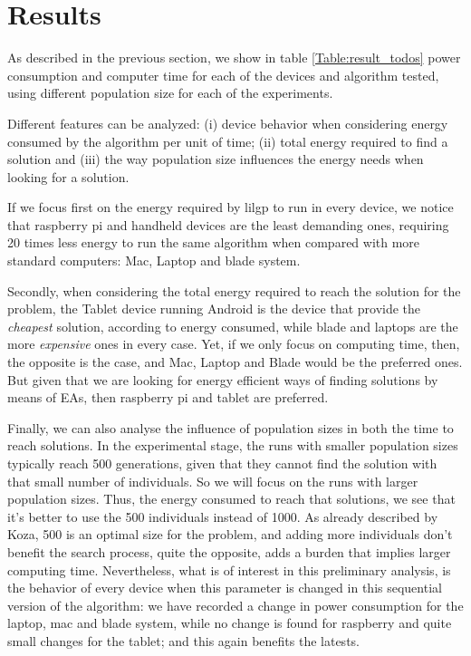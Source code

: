 \section{Results}
\label{results}

As described in the previous section, we show in table \ref{Table:result_todos} power consumption and computer time for each of the devices and algorithm tested, using different population size for each of the experiments.  

Different features can be analyzed:  (i) device behavior when considering energy consumed by the algorithm per unit of time; (ii) total energy required to find a solution and (iii) the way population size influences the energy needs when looking for a solution.

If we focus first on the energy required by lilgp to run in every device, we notice that raspberry pi and handheld devices are the least demanding ones, requiring 20 times less energy to run the same algorithm when compared with more standard computers:  Mac, Laptop and blade system.

Secondly, when considering the total energy required to reach the solution for the problem, the Tablet device running Android is the device that provide the \textit{cheapest} solution, according to energy consumed, while blade and laptops are the more \textit{expensive} ones in every case.  Yet, if we only focus on computing time, then, the opposite is the case, and Mac, Laptop and Blade would be the preferred ones.  But given that we are looking for energy efficient ways of finding solutions by means of EAs, then raspberry pi and tablet are preferred.

Finally, we can also analyse the influence of population sizes in both the time to reach solutions.  In the experimental stage, the runs with smaller population sizes typically reach 500 generations, given that they cannot find the solution with that small number of individuals.  So we will focus on the runs with larger population sizes.  Thus, the energy consumed to reach that solutions, we see that it's better to use the 500 individuals instead of 1000.  As already described by Koza, 500 is an optimal size for the problem, and adding more individuals don't benefit the search process, quite the opposite, adds a burden that implies larger computing time.  Nevertheless, what is of interest in this preliminary analysis, is the behavior of every device when this parameter is changed in this sequential version of the algorithm:  we have recorded a change in power consumption for the laptop, mac and blade system, while no change is found for raspberry and quite small changes for the tablet;  and this again benefits the latests.  


